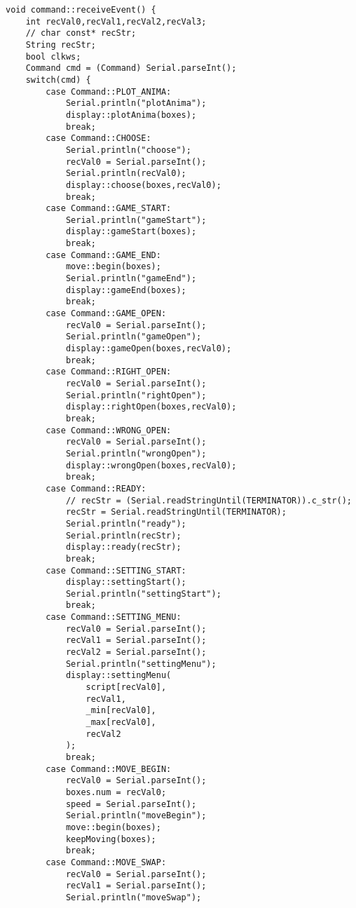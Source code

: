 \begin{verbatim}
void command::receiveEvent() {
    int recVal0,recVal1,recVal2,recVal3;
    // char const* recStr;
    String recStr;
    bool clkws;
    Command cmd = (Command) Serial.parseInt();
    switch(cmd) {
        case Command::PLOT_ANIMA:
            Serial.println("plotAnima");
            display::plotAnima(boxes);
            break;
        case Command::CHOOSE:
            Serial.println("choose");
            recVal0 = Serial.parseInt();
            Serial.println(recVal0);
            display::choose(boxes,recVal0);
            break;
        case Command::GAME_START:
            Serial.println("gameStart");
            display::gameStart(boxes);
            break;
        case Command::GAME_END:
            move::begin(boxes);
            Serial.println("gameEnd");
            display::gameEnd(boxes);
            break;
        case Command::GAME_OPEN:
            recVal0 = Serial.parseInt();
            Serial.println("gameOpen");
            display::gameOpen(boxes,recVal0);
            break;
        case Command::RIGHT_OPEN:
            recVal0 = Serial.parseInt();
            Serial.println("rightOpen");
            display::rightOpen(boxes,recVal0);
            break;
        case Command::WRONG_OPEN:
            recVal0 = Serial.parseInt();
            Serial.println("wrongOpen");
            display::wrongOpen(boxes,recVal0);
            break;
        case Command::READY:
            // recStr = (Serial.readStringUntil(TERMINATOR)).c_str();
            recStr = Serial.readStringUntil(TERMINATOR);
            Serial.println("ready");
            Serial.println(recStr);
            display::ready(recStr);
            break;
        case Command::SETTING_START:
            display::settingStart();
            Serial.println("settingStart");
            break;
        case Command::SETTING_MENU:
            recVal0 = Serial.parseInt();
            recVal1 = Serial.parseInt();
            recVal2 = Serial.parseInt();
            Serial.println("settingMenu");
            display::settingMenu(
                script[recVal0],
                recVal1,
                _min[recVal0],
                _max[recVal0], 
                recVal2
            );
            break;
        case Command::MOVE_BEGIN:
            recVal0 = Serial.parseInt();
            boxes.num = recVal0;
            speed = Serial.parseInt();
            Serial.println("moveBegin");
            move::begin(boxes);
            keepMoving(boxes);
            break;
        case Command::MOVE_SWAP:
            recVal0 = Serial.parseInt();
            recVal1 = Serial.parseInt();
            Serial.println("moveSwap");

\end{verbatim}
